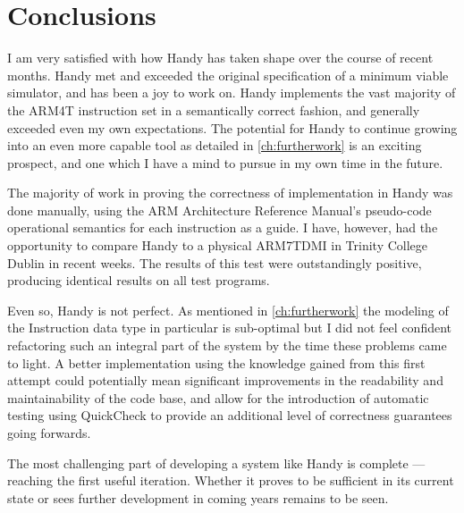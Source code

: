 
\chapter{Conclusions} %

\label{ch:conclusion} %


I am very satisfied with how Handy has taken shape over the course of recent months. Handy met and exceeded the original specification of a minimum viable simulator, and has been a joy to work on. Handy implements the vast majority of the ARM4T instruction set in a semantically correct fashion, and generally exceeded even my own expectations. The potential for Handy to continue growing into an even more capable tool as detailed in \autoref{ch:furtherwork} is an exciting prospect, and one which I have a mind to pursue in my own time in the future.

The majority of work in proving the correctness of implementation in Handy was done manually, using the ARM Architecture Reference Manual's pseudo-code operational semantics for each instruction as a guide. I have, however, had the opportunity to compare Handy to a physical ARM7TDMI in Trinity College Dublin in recent weeks. The results of this test were outstandingly positive, producing identical results on all test programs.

Even so, Handy is not perfect. As mentioned in \autoref{ch:furtherwork} the modeling of the Instruction data type in particular is sub-optimal but I did not feel confident refactoring such an integral part of the system by the time these problems came to light. A better implementation using the knowledge gained from this first attempt could potentially mean significant improvements in the readability and maintainability of the code base, and allow for the introduction of automatic testing using QuickCheck to provide an additional level of correctness guarantees going forwards.

The most challenging part of developing a system like Handy is complete --- reaching the first useful iteration. Whether it proves to be sufficient in its current state or sees further development in coming years remains to be seen.

